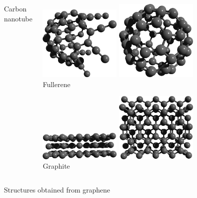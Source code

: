 \documentclass{beamer}
\begin{document}
\begin{frame}
\begin{columns}
\begin{center}
\vspace{3mm}
Carbon nanotube
\end{center}

\begin{center}
\includegraphics[width=0.35\textwidth]{figs/fullerene2.png} 
\hspace{5mm}
\includegraphics[width=0.35\textwidth]{figs/fullerene1.png}\\
Fullerene

\vspace{5mm}
\includegraphics[width=0.35\textwidth]{figs/graphite2.png} 
\vspace{2mm} \hspace{5mm}
\includegraphics[width=0.35\textwidth]{figs/graphite1.png}\\
Graphite

\end{center}

\end{columns}

\vspace{3mm}
\begin{center}
{\huge Structures obtained from graphene}
\end{center}

\end{frame}
\end{document}
